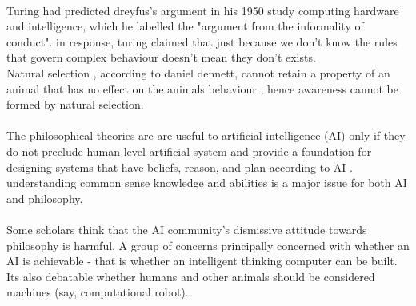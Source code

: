 \documentclass[12pt]{article}
\begin{document}
\paragraph{}
Turing had predicted dreyfus's argument in his 1950 study computing hardware and intelligence, which he labelled the "argument from the informality of conduct". in response, turing claimed that just because we don't know the rules that govern complex behaviour doesn't mean they don't exists.
\\Natural selection , according to daniel dennett, cannot retain a property of an animal that has no effect on the animals behaviour , hence awareness cannot be formed by natural selection.
\paragraph{}
The philosophical theories are are useful to artificial intelligence (AI) only if they do not preclude human level artificial system and provide a foundation for designing systems that have beliefs, reason, and plan according to AI . understanding common sense knowledge and abilities is a major issue for both AI and philosophy.  
\paragraph{}
Some scholars think that the AI community's dismissive attitude towards philosophy is harmful.
A group of concerns principally concerned with whether an AI is achievable - that is whether an intelligent thinking computer can be built. Its also debatable whether humans and other animals should be considered machines (say, computational robot).
\end{document}
